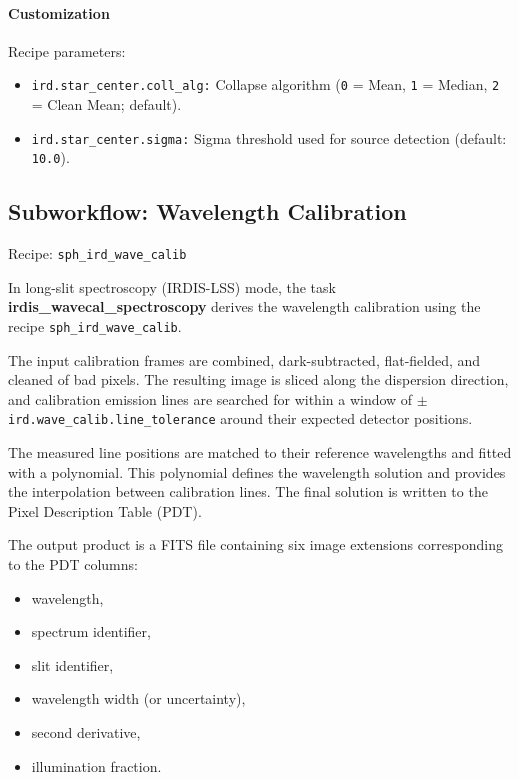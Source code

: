 \paragraph{Customization}

Recipe parameters:

\begin{itemize}

\item \texttt{ird.star\_center.coll\_alg:} 
Collapse algorithm
(\texttt{0} = Mean,
 \texttt{1} = Median,
 \texttt{2} = Clean Mean; default).

\item \texttt{ird.star\_center.sigma:} 
Sigma threshold used for source detection
(default: \texttt{10.0}).

\end{itemize}

\subsection{Subworkflow: Wavelength Calibration}

Recipe: \texttt{sph\_ird\_wave\_calib}

In long-slit spectroscopy (IRDIS-LSS) mode, the task
\textbf{irdis\_wavecal\_spectroscopy} derives the wavelength calibration using
the recipe \texttt{sph\_ird\_wave\_calib}.

The input calibration frames are combined, dark-subtracted, flat-fielded, and
cleaned of bad pixels. The resulting image is sliced along the dispersion
direction, and calibration emission lines are searched for within a window of
$\pm$\texttt{ird.wave\_calib.line\_tolerance} around their expected detector
positions.

The measured line positions are matched to their reference wavelengths and
fitted with a polynomial. This polynomial defines the wavelength solution and
provides the interpolation between calibration lines. The final solution is
written to the Pixel Description Table (PDT).

The output product is a FITS file containing six image extensions
corresponding to the PDT columns:

\begin{itemize}
    \item wavelength,
    \item spectrum identifier,
    \item slit identifier,
    \item wavelength width (or uncertainty),
    \item second derivative,
    \item illumination fraction.
\end{itemize}

